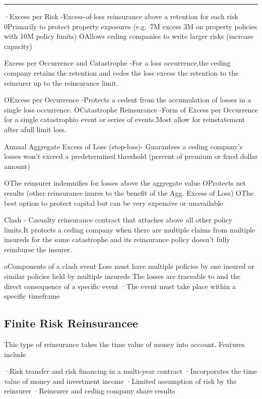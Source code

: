 \documentclass[
]{article}
\begin{document}
\begin{center}\rule{0.5\linewidth}{0.5pt}\end{center}

·Excess per Risk -Excess-of-loss reinsurance above a retention for each
risk 0Primarily to protect property exposures (e.g.~7M excess 3M on
property policies with 10M policy limits) OAllows ceding companies to
write larger risks (increase capacity)

Excess per Occurrence and Catastrophe -For a loss occurrence,the ceding
company retains the retention and cedes the loss excess the retention to
the reinsurer up to the reinsurance limit.

OExcess per Occurrence -Protects a cedent from the accumulation of
losses in a single loss occurrence. OCatastrophe Reinsurance -Form of
Excess per Occurrence for a single catastrophio event or series of
events.Most allow for reinstatement after afull limit loss.

Annual Aggregate Excess of Loss (stop-loss)- Guarantees a ceding
company's losses won't exceed a predetermined threshold (percent of
premium or fixed dollar amount)

OThe reinsurer indemnifies for losses above the aggregate value
OProtects net results (other reinsurance inures to the benefit of the
Agg. Excess of Loss) OThe best option to protect capital but can be very
expensive or unavailable

Clash - Casualty reinsurance contract that attaches above all other
policy limits.It protects a ceding company when there are multiple
claims from multiple insureds for the same catastrophe and its
reinsurance policy doesn't fully reimburse the insurer.

oComponents of a clash event Loss must have multiple policies by one
insured or similar policies held by multiple insureds The losses are
traceable to and the direct consequence of a specific event ·The event
must take place within a specific timeframe

\subsection{Finite Risk Reinsurancee}\label{finite-risk-reinsurancee}

This type of reinsurance takes the time value of money into account.
Features include

·Risk transfer and risk financing in a multi-year contract ·Incorporates
the time value of money and investment income ·Limited assumption of
risk by the reinsurer ·Reinsurer and ceding company share results
\end{document}

